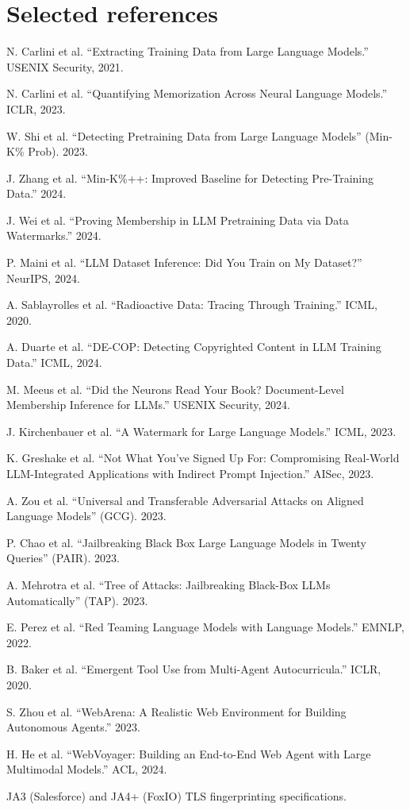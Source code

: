 \documentclass[11pt]{article}
\begin{document}
\section*{Selected references}

{\small
\begin{enumerate}[label={[\arabic*]},leftmargin=2.4em,itemsep=2pt]
\item N. Carlini et al. ``Extracting Training Data from Large Language Models.'' USENIX Security, 2021.
\item N. Carlini et al. ``Quantifying Memorization Across Neural Language Models.'' ICLR, 2023.
\item W. Shi et al. ``Detecting Pretraining Data from Large Language Models'' (Min-K\% Prob). 2023.
\item J. Zhang et al. ``Min-K\%++: Improved Baseline for Detecting Pre-Training Data.'' 2024.
\item J. Wei et al. ``Proving Membership in LLM Pretraining Data via Data Watermarks.'' 2024.
\item P. Maini et al. ``LLM Dataset Inference: Did You Train on My Dataset?'' NeurIPS, 2024.
\item A. Sablayrolles et al. ``Radioactive Data: Tracing Through Training.'' ICML, 2020.
\item A. Duarte et al. ``DE-COP: Detecting Copyrighted Content in LLM Training Data.'' ICML, 2024.
\item M. Meeus et al. ``Did the Neurons Read Your Book? Document-Level Membership Inference for LLMs.'' USENIX Security, 2024.
\item J. Kirchenbauer et al. ``A Watermark for Large Language Models.'' ICML, 2023.
\item K. Greshake et al. ``Not What You've Signed Up For: Compromising Real-World LLM-Integrated Applications with Indirect Prompt Injection.'' AISec, 2023.
\item A. Zou et al. ``Universal and Transferable Adversarial Attacks on Aligned Language Models'' (GCG). 2023.
\item P. Chao et al. ``Jailbreaking Black Box Large Language Models in Twenty Queries'' (PAIR). 2023.
\item A. Mehrotra et al. ``Tree of Attacks: Jailbreaking Black-Box LLMs Automatically'' (TAP). 2023.
\item E. Perez et al. ``Red Teaming Language Models with Language Models.'' EMNLP, 2022.
\item B. Baker et al. ``Emergent Tool Use from Multi-Agent Autocurricula.'' ICLR, 2020.
\item S. Zhou et al. ``WebArena: A Realistic Web Environment for Building Autonomous Agents.'' 2023.
\item H. He et al. ``WebVoyager: Building an End-to-End Web Agent with Large Multimodal Models.'' ACL, 2024.
\item JA3 (Salesforce) and JA4+ (FoxIO) TLS fingerprinting specifications.
\end{enumerate}}
\end{document}
